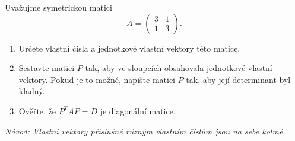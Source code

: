 Uvažujme symetrickou matici
\begin{equation*} A=
  \begin{pmatrix}
  3 & 1\\
  1 & 3
\end{pmatrix}.
\end{equation*}
\begin{enumerate}
\item Určete vlastní čísla a jednotkové vlastní vektory této matice.
\item Sestavte matici $P$ tak, aby ve sloupcích obsahovala jednotkové vlastní vektory.
Pokud je to možné, napište matici $P$ tak, aby její determinant byl kladný.
\item Ověřte, že  $P^TAP=D$  je diagonální matice.
\end{enumerate}
\textit{Návod: Vlastní vektory příslušné různým vlastním číslům jsou na sebe kolmé.}

